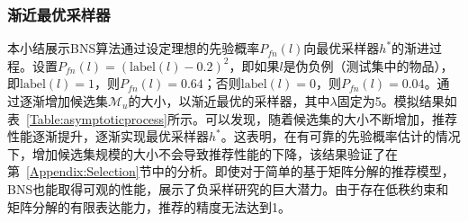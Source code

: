 \subsubsection{渐近最优采样器}\label{Appendix:Asymptotic}
本小结展示BNS算法通过设定理想的先验概率$P_{fn}(l)$向最优采样器$h^*$的渐进过程。设置$P_{fn}(l) = (\text{label}(l)-0.2)^2$，即如果$l$是伪负例（测试集中的物品），即$\text{label}(l)=1$，则$P_{fn}(l)=0.64$；否则$\text{label}(l)=0$，则$P_{fn}(l)=0.04$。通过逐渐增加候选集$\mathcal{M}_u$的大小，以渐近最优的采样器，其中$\lambda$固定为5。模拟结果如表~\ref{Table:asymptoticprocess}所示。可以发现，随着候选集的大小不断增加，推荐性能逐渐提升，逐渐实现最优采样器$h^*$。这表明，在有可靠的先验概率估计的情况下，增加候选集规模的大小不会导致推荐性能的下降，该结果验证了在第~\ref{Appendix:Selection}节中的分析。即使对于简单的基于矩阵分解的推荐模型，BNS也能取得可观的性能，展示了负采样研究的巨大潜力。由于存在低秩约束和矩阵分解的有限表达能力，推荐的精度无法达到1。
